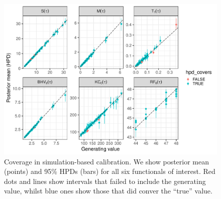 \documentclass[oneside]{article}
\begin{document}
\begin{figure}
 \includegraphics[width=\textwidth]{../figures/coverage.pdf}
    \caption{Coverage in simulation-based calibration.
    We show posterior mean (points) and 95\% HPDs (bars) for all six functionals of interest.
    Red dots and lines show intervals that failed to include the generating value, whilst blue ones show those that did conver the ``true'' value.}
  \label{fig:phylo_calibration}
\end{figure}

  

\end{document}
